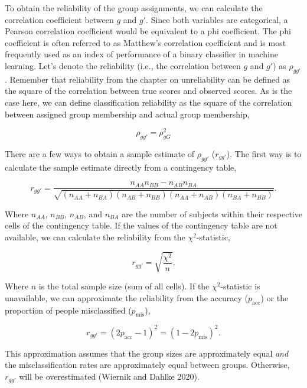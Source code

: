 \documentclass[
  letterpaper,
  DIV=11,
  numbers=noendperiod]{scrreprt}
\begin{document}
To obtain the reliability of the group assignments, we can calculate the
correlation coefficient between \(g\) and \(g'\). Since both variables
are categorical, a Pearson correlation coefficient would be equivalent
to a phi coefficient. The phi coefficient is often referred to as
Matthew's correlation coefficient and is most frequently used as an
index of performance of a binary classifier in machine learning. Let's
denote the reliability (i.e., the correlation between \(g\) and \(g'\))
as \(\rho_{gg'}\). Remember that reliability from the chapter on
unreliability can be defined as the square of the correlation between
true scores and observed scores. As is the case here, we can define
classification reliability as the square of the correlation between
assigned group membership and actual group membership,

\[
\rho_{gg'} = \rho^2_{gG}
\]

There are a few ways to obtain a sample estimate of \(\rho_{gg'}\)
(\(r_{gg'}\)). The first way is to calculate the sample estimate
directly from a contingency table,

\[
r_{gg'} = \frac{n_{AA}n_{BB}-n_{AB}n_{BA}}{\sqrt{(n_{AA}+n_{BA})(n_{AB}+n_{BB})(n_{AA}+n_{AB})(n_{BA}+n_{BB})}}.
\]

Where \(n_{AA}\), \(n_{BB}\), \(n_{AB}\), and \(n_{BA}\) are the number
of subjects within their respective cells of the contingency table. If
the values of the contingency table are not available, we can calculate
the reliability from the \(\chi^2\)-statistic,

\[
r_{gg'} = \sqrt{\frac{\chi^2}{n}}.
\]

Where \(n\) is the total sample size (sum of all cells). If the
\(\chi^2\)-statistic is unavailable, we can approximate the reliability
from the accuracy (\(p_{\text{acc}}\)) or the proportion of people
misclassified (\(p_{\text{mis}}\)),

\[
r_{gg'} = (2p_{\text{acc}}-1)^2 = (1-2p_{\text{mis}})^2.
\]

This approximation assumes that the group sizes are approximately equal
\emph{and} the misclassification rates are approximately equal between
groups. Otherwise, \(r_{gg'}\) will be overestimated (Wiernik and Dahlke
2020).
\end{document}
